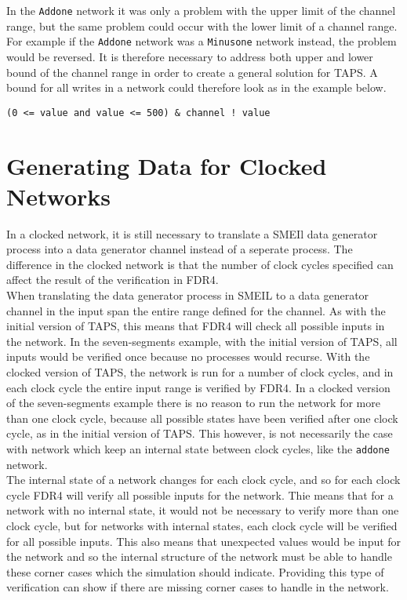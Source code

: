 In the \texttt{Addone} network it was only a problem with the upper limit of the channel range, but the same problem could occur with the lower limit of a channel range. For example if the \texttt{Addone} network was a \texttt{Minusone} network instead, the problem would be reversed. It is therefore necessary to address both upper and lower bound of the channel range in order to create a general solution for TAPS. A bound for all writes in a network could therefore look as in the example below.
\begin{verbatim}
(0 <= value and value <= 500) & channel ! value
\end{verbatim}
\section{Generating Data for Clocked Networks}
In a clocked \cspm{} network, it is still necessary to translate a SMEIl data generator process into a \cspm{} data generator channel instead of a seperate process. The difference in the clocked network is that the number of clock cycles specified can affect the result of the verification in FDR4. \\

When translating the data generator process in SMEIL to a data generator channel in \cspm{} the input span the entire range defined for the channel. As with the initial version of TAPS, this means that FDR4 will check all possible inputs in the network. In the seven-segments example, with the initial version of TAPS, all inputs would be verified once because no processes would recurse.
With the clocked version of TAPS, the network is run for a number of clock cycles, and in each clock cycle the entire input range is verified by FDR4.
In a clocked version of the seven-segments example there is no reason to run the network for more than one clock cycle, because all possible states have been verified after one clock cycle, as in the initial version of TAPS. This however, is not necessarily the case with network which keep an internal state between clock cycles, like the \texttt{addone} network.\\

The internal state of a network changes for each clock cycle, and so for each clock cycle FDR4 will verify all possible inputs for the network. Thie means that for a network with no internal state, it would not be necessary to verify more than one clock cycle, but for networks with internal states, each clock cycle will be verified for all possible inputs. This also means that unexpected values would be input for the network and so the internal structure of the network must be able to handle these corner cases which the simulation should indicate. Providing this type of verification can show if there are missing corner cases to handle in the network.\\

